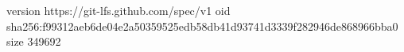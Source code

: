version https://git-lfs.github.com/spec/v1
oid sha256:f99312aeb6de04e2a50359525edb58db41d93741d3339f282946de868966bba0
size 349692
